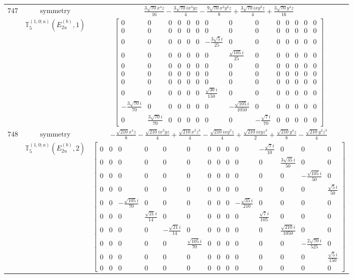 \documentclass[fleqn,8pt,landscape]{jsarticle}
\begin{document}
\begin{longtable}{ccc}
$ 747 $ & $ \text{symmetry} $ & $ \frac{3 \sqrt{70} x^{4} z}{16} - \frac{3 \sqrt{70} i x^{3} y z}{4} - \frac{9 \sqrt{70} x^{2} y^{2} z}{8} + \frac{3 \sqrt{70} i x y^{3} z}{4} + \frac{3 \sqrt{70} y^{4} z}{16} $ \\
$  $ & $ \mathbb{T}_{5}^{(1,0;a)}(E_{2u}^{(b)},1) $ & $ \begin{bmatrix} 0 & 0 & 0 & 0 & 0 & 0 & 0 & 0 & 0 & 0 & 0 & 0 & 0 & 0 \\ 0 & 0 & 0 & 0 & 0 & 0 & 0 & 0 & 0 & 0 & 0 & 0 & 0 & 0 \\ 0 & 0 & 0 & 0 & 0 & 0 & - \frac{3 \sqrt{5} i}{25} & 0 & 0 & 0 & 0 & 0 & 0 & 0 \\ 0 & 0 & 0 & 0 & 0 & 0 & 0 & \frac{\sqrt{105} i}{25} & 0 & 0 & 0 & 0 & 0 & 0 \\ 0 & 0 & 0 & 0 & 0 & 0 & 0 & 0 & 0 & 0 & 0 & 0 & 0 & 0 \\ 0 & 0 & 0 & 0 & 0 & 0 & 0 & 0 & 0 & 0 & 0 & 0 & 0 & 0 \\ 0 & 0 & 0 & 0 & 0 & 0 & 0 & 0 & 0 & 0 & 0 & 0 & 0 & 0 \\ 0 & 0 & 0 & 0 & 0 & 0 & \frac{\sqrt{30} i}{150} & 0 & 0 & 0 & 0 & 0 & 0 & 0 \\ - \frac{3 \sqrt{70} i}{70} & 0 & 0 & 0 & 0 & 0 & 0 & - \frac{\sqrt{105} i}{1050} & 0 & 0 & 0 & 0 & 0 & 0 \\ 0 & \frac{3 \sqrt{70} i}{70} & 0 & 0 & 0 & 0 & 0 & 0 & - \frac{\sqrt{7} i}{70} & 0 & 0 & 0 & 0 & 0 \end{bmatrix} $ \\ \hline
$ 748 $ & $ \text{symmetry} $ & $ - \frac{\sqrt{210} x^{4} z}{8} - \frac{\sqrt{210} i x^{3} y z}{4} + \frac{\sqrt{210} x^{2} z^{3}}{4} - \frac{\sqrt{210} i x y^{3} z}{4} + \frac{\sqrt{210} i x y z^{3}}{2} + \frac{\sqrt{210} y^{4} z}{8} - \frac{\sqrt{210} y^{2} z^{3}}{4} $ \\
$  $ & $ \mathbb{T}_{5}^{(1,0;a)}(E_{2u}^{(b)},2) $ & $ \begin{bmatrix} 0 & 0 & 0 & 0 & 0 & 0 & 0 & 0 & 0 & 0 & - \frac{\sqrt{7} i}{10} & 0 & 0 & 0 \\ 0 & 0 & 0 & 0 & 0 & 0 & 0 & 0 & 0 & 0 & 0 & \frac{3 \sqrt{35} i}{50} & 0 & 0 \\ 0 & 0 & 0 & 0 & 0 & 0 & 0 & 0 & 0 & 0 & 0 & 0 & - \frac{\sqrt{105} i}{50} & 0 \\ 0 & 0 & 0 & 0 & 0 & 0 & 0 & 0 & 0 & 0 & 0 & 0 & 0 & \frac{\sqrt{5} i}{50} \\ 0 & 0 & - \frac{\sqrt{105} i}{70} & 0 & 0 & 0 & 0 & 0 & 0 & - \frac{\sqrt{35} i}{210} & 0 & 0 & 0 & 0 \\ 0 & 0 & 0 & \frac{\sqrt{21} i}{14} & 0 & 0 & 0 & 0 & 0 & 0 & \frac{\sqrt{7} i}{105} & 0 & 0 & 0 \\ 0 & 0 & 0 & 0 & - \frac{\sqrt{21} i}{14} & 0 & 0 & 0 & 0 & 0 & 0 & \frac{\sqrt{210} i}{1050} & 0 & 0 \\ 0 & 0 & 0 & 0 & 0 & \frac{\sqrt{105} i}{70} & 0 & 0 & 0 & 0 & 0 & 0 & - \frac{2 \sqrt{70} i}{525} & 0 \\ 0 & 0 & 0 & 0 & 0 & 0 & 0 & 0 & 0 & 0 & 0 & 0 & 0 & \frac{\sqrt{5} i}{150} \\ 0 & 0 & 0 & 0 & 0 & 0 & 0 & 0 & 0 & 0 & 0 & 0 & 0 & 0 \end{bmatrix} $ \\ \hline

\end{longtable}
\end{document}
